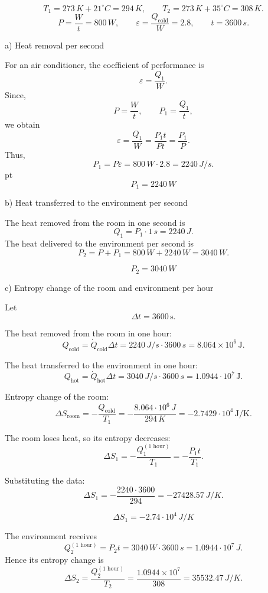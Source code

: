 \documentclass[t,aspectratio=169]{beamer}
\begin{document}
\begin{frame}
\begin{itemize}
\begin{enumerate}


$$ T_1 = 273\,K + 21^{\circ}C = 294\,K, \qquad T_2 = 273\,K + 35^{\circ}C = 308\,K.$$
$$P =  \frac{W}{t} = 800\,W,\qquad\varepsilon =  \frac{Q_{\mathrm{cold}}}{W}=2.8,\qquad t = 3600\,s.$$

\pagebreak
a) Heat removal per second

For an air conditioner, the coefficient of performance is
$$ \varepsilon = \frac{Q_1}{W}.$$
Since,
$$ P = \frac{W}{t},\qquad P_1 = \frac{Q_1}{t},$$
we obtain
$$\varepsilon = \frac{Q_1}{W} = \frac{P_1 t}{P t} = \frac{P_1}{P}.$$
Thus,
$$P_1 = P \varepsilon = 800\,W \cdot 2.8 = 2240\,J/s.$$
 pt
$$\boxed{P_1 = 2240\,W}$$


\pagebreak
b) Heat transferred to the environment per second

The heat removed from the room in one second is
$$Q_1 = P_1 \cdot 1\,s = 2240\,J.$$
The heat delivered to the environment per second is
$$ P_2 = P + P_1 = 800\,W + 2240\,W = 3040\,W.$$

$$ \boxed{P_2 = 3040\,W}$$

\pagebreak
c) Entropy change of the room and environment per hour

Let
$$ \Delta t = 3600\,\mathrm{s}. $$

The heat removed from the room in one hour:
$$ Q_{\mathrm{cold}} = \dot Q_{\mathrm{cold}} \Delta t
= 2240\,J/s \cdot 3600\,s
= 8.064 \times 10^6\,\mathrm{J}. $$

The heat transferred to the environment in one hour:
$$ Q_{\mathrm{hot}} = \dot Q_{\mathrm{hot}} \Delta t
= 3040\,J/s \cdot 3600\,s
= 1.0944 \cdot 10^7\,\mathrm{J}.$$

Entropy change of the room:
$$ \Delta S_{\mathrm{room}} = -\frac{Q_{\mathrm{cold}}}{T_1}
= -\frac{8.064\cdot 10^6\,J}{294\,K}
= -2.7429\cdot 10^4\,\mathrm{J/K}. $$


The room loses heat, so its entropy decreases:
$$\Delta S_1 = -\frac{Q_1^{(\text{1 hour})}}{T_1}
= -\frac{P_1 t}{T_1}.$$

Substituting the data:
$$\Delta S_1 = -\frac{2240 \cdot 3600}{294}
= -27428.57\,J/K.$$

$$\boxed{\Delta S_1 = -2.74\cdot10^4\,J/K}$$

The environment receives
$$Q_2^{(\text{1 hour})} = P_2 t = 3040\,W \cdot 3600\,s
= 1.0944\cdot10^7\,J.$$
Hence its entropy change is
$$ \Delta S_2 = \frac{Q_2^{(\text{1 hour})}}{T_2}
= \frac{1.0944 \times 10^7}{308}
= 35532.47\,J/K.$$


\end{enumerate}
\end{itemize}
\end{frame}
\end{document}
